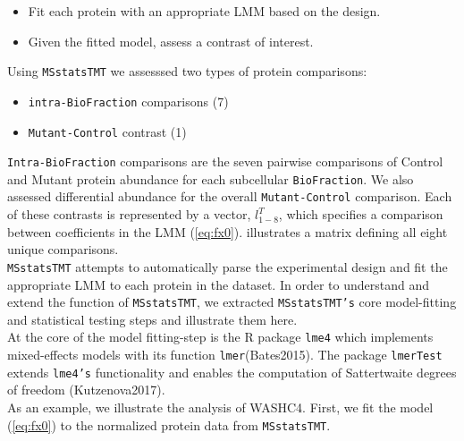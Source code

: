 \documentclass[12pt]{elife}\usepackage[]{graphicx}\usepackage[]{color}
\begin{document}
\begin{itemize}
	\item Fit each protein with an appropriate LMM based on the design.
	\item Given the fitted model, assess a contrast of interest.
\end{itemize}

Using \texttt{MSstatsTMT} we assesssed two types of protein comparisons:\\

\begin{itemize}
	\item \texttt{intra-BioFraction} comparisons (7)
	\item \texttt{Mutant-Control} contrast  (1)
\end{itemize}

\texttt{Intra-BioFraction} comparisons are the seven pairwise comparisons of 
Control and Mutant protein abundance for each subcellular
\texttt{BioFraction}. We also assessed differential abundance for the 
overall \texttt{Mutant-Control} comparison. Each of these contrasts is 
represented by a vector, $l^T_{1-8}$, which specifies a comparison between 
coefficients in the LMM (\ref{eq:fx0}).
 illustrates a matrix defining all eight unique comparisons.\\


\texttt{MSstatsTMT} attempts to automatically parse the experimental design and
fit the appropriate LMM to each protein in the dataset. In order to understand 
and extend the function of \texttt{MSstatsTMT}, 
we extracted \texttt{MSstatsTMT's} core model-fitting and statistical 
testing steps and illustrate them here.\\

At the core of the model fitting-step is the
R package \texttt{lme4} which implements mixed-effects models with its function
\texttt{lmer}(Bates2015). The package \texttt{lmerTest} extends \texttt{lme4's}
functionality and enables the computation of 
Sattertwaite degrees of freedom (Kutzenova2017).\\

As an example, we illustrate the analysis of WASHC4. First, we fit 
the model (\ref{eq:fx0}) to the normalized protein data from
\texttt{MSstatsTMT}.
\end{document}
